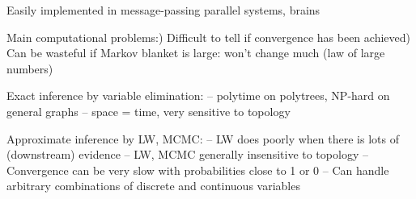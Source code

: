 \documentclass{article}
\begin{document}
\begin{huge}
Easily implemented in message-passing parallel systems, brains

Main computational problems:) Difficult to tell if convergence has been achieved) Can be wasteful if Markov blanket is large:\nl
     won't change much (law of large numbers)


Exact inference by variable elimination:\al
 -- polytime on polytrees, NP-hard on general graphs\al
 -- space = time, very sensitive to topology

Approximate inference by LW, MCMC:\al
 -- LW does poorly when there is lots of (downstream) evidence\al
 -- LW, MCMC generally insensitive to topology\al
 -- Convergence can be very slow with probabilities close to 1 or 0\al
 -- Can handle arbitrary combinations of discrete and continuous variables



\end{huge} 
\end{document}
